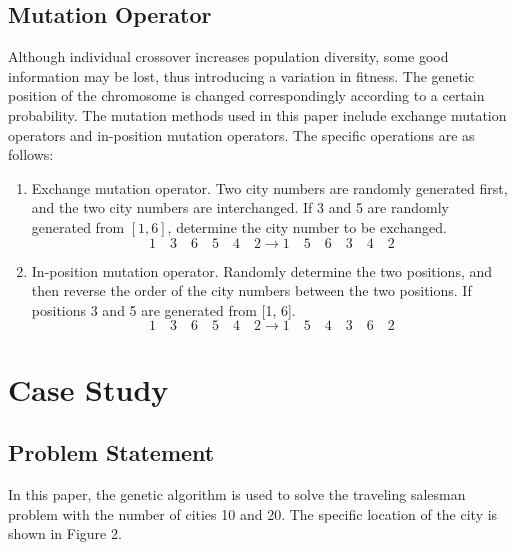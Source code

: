 \documentclass[12pt]{article}
\begin{document}
\subsection{Mutation Operator}
Although individual crossover increases population diversity, some good information may be lost, thus introducing a variation in fitness. The genetic position of the chromosome is changed correspondingly according to a certain probability. The mutation methods used in this paper include exchange mutation operators and in-position mutation operators. The specific operations are as follows:
\begin{enumerate}
    \item Exchange mutation operator. Two city numbers are randomly generated first, and the two city numbers are interchanged. If 3 and 5 are randomly generated from $[1, 6]$, determine the city number to be exchanged.
    \[1\quad 3\quad 6\quad 5\quad 4\quad 2 \longrightarrow 1\quad 5\quad 6\quad 3\quad 4\quad 2 \]
    \item In-position mutation operator. Randomly determine the two positions, and then reverse the order of the city numbers between the two positions. If positions 3 and 5 are generated from [1, 6].
    \[1\quad 3\quad 6\quad 5\quad 4\quad 2 \longrightarrow 1\quad 5\quad 4\quad 3\quad 6\quad 2\]
\end{enumerate}
\section{Case Study}
\subsection{Problem Statement}
In this paper, the genetic algorithm is used to solve the traveling salesman problem with the number of cities 10 and 20. The specific location of the city is shown in Figure 2.
\end{document}
